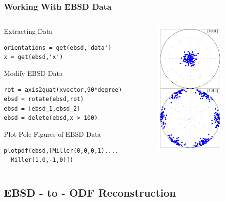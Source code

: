 \documentclass{beamer}
\begin{document}
\begin{frame}[fragile]
  \frametitle{Working With EBSD Data}
  
  \begin{columns}
    \begin{column}{8.5cm}
Extracting Data
\begin{lstlisting}
orientations = get(ebsd,'data')
x = get(ebsd,'x')
\end{lstlisting}

\medskip

Modify EBSD Data
\begin{lstlisting}
rot = axis2quat(xvector,90*degree)
ebsd = rotate(ebsd,rot) 
ebsd = [ebsd_1,ebsd_2] 
ebsd = delete(ebsd,x > 100)
\end{lstlisting}

\medskip

Plot Pole Figures of EBSD Data
\begin{lstlisting}
plotpdf(ebsd,[Miller(0,0,0,1),...
  Miller(1,0,-1,0)])
\end{lstlisting}      
    \end{column}

    \begin{column}{3.5cm}
      \includegraphics[width=3.5cm]{pic/EBSDpdf}
    \end{column}
  \end{columns}



\end{frame}


\subsection*{EBSD - to - ODF Reconstruction}
\end{document}
